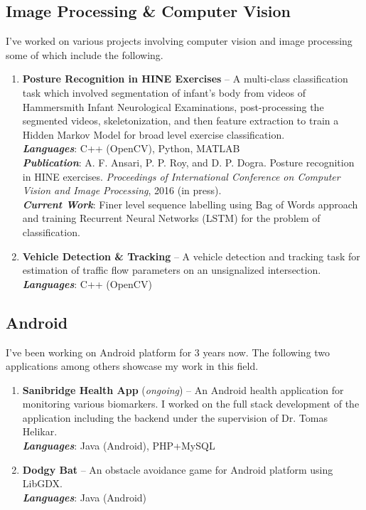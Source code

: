 \documentclass[runningheads,a4paper]{llncs}
\begin{document}
\subsection{Image Processing \& Computer Vision}

I've worked on various projects involving computer vision and image processing some of which include the following.

\begin{enumerate}

\item \textbf{Posture Recognition in HINE Exercises} -- A multi-class classification task which involved segmentation of infant's body from videos of Hammersmith Infant Neurological Examinations, post-processing the segmented videos, skeletonization, and then feature extraction to train a Hidden Markov Model for broad level exercise classification.  \\
\textbf{\emph{Languages}}: C++ (OpenCV), Python, MATLAB \\
\textbf{\emph{Publication}}: A. F. Ansari, P. P. Roy, and D. P. Dogra. Posture recognition in HINE exercises. \emph{Proceedings of International Conference on Computer Vision and Image Processing}, 2016 (in press). \\
\textbf{\emph{Current Work}}: Finer level sequence labelling using Bag of Words approach and training Recurrent Neural Networks (LSTM) for the problem of classification.
\item \textbf{Vehicle Detection \& Tracking} -- A vehicle detection and tracking task for estimation of traffic flow parameters on an unsignalized intersection. \\
\textbf{\emph{Languages}}: C++ (OpenCV)

\end{enumerate}

\subsection{Android}

I've been working on Android platform for 3 years now. The following two applications among others showcase my work in this field.

\begin{enumerate}
\item \textbf{Sanibridge Health App} (\emph{ongoing}) -- An Android health application for monitoring various biomarkers. I worked on the full stack development of the application including the backend under the supervision of Dr. Tomas Helikar. \\
\textbf{\emph{Languages}}: Java (Android), PHP+MySQL
\item \textbf{Dodgy Bat} -- An obstacle avoidance game for Android platform using LibGDX. \\
\textbf{\emph{Languages}}: Java (Android)

\end{enumerate}
\end{document}
